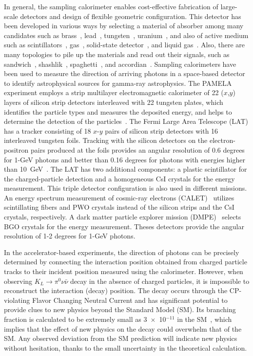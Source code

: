 \documentclass[12pt,times,draftclsnofoot,a4paper]{elsarticle}
\begin{document}
In general, the sampling calorimeter enables cost-effective fabrication of large-scale detectors and design of flexible geometric configuration. This detector has been developed in various ways by selecting a material of absorber among many candidates such as brass~\cite{CMS:mat}, lead~\cite{CDF:mat}, tungsten~\cite{DELPHI:mat}, uranium~\cite{UGAS:mat}, and also of active medium such as scintillators~\cite{CMS:mat,CDF:mat}, gas~\cite{UGAS:mat}, solid-state detector~\cite{DELPHI:mat}, and liquid gas~\cite{LiqAR:mat}. Also, there are many topologies to pile up the materials and read out their signals, such as sandwich~\cite{KOTO:MB}, shashlik~\cite{shashlik:con}, spaghetti~\cite{KLOE:con}, and accordian~\cite{LiqAR:mat}. Sampling calorimeters have been used to measure the direction of arriving photons in a space-based detector to identify astrophysical sources for gamma-ray astrophysics. The PAMELA experiment employs a strip multilayer electromagnetic calorimeter of 22 ($x$,$y$) layers of silicon strip detectors interleaved with 22 tungsten plates, which identifies the particle types and measures the deposited energy, and helps to determine the detection of the particles~\cite{PAMELA}. The Fermi Large Area Telescope (LAT) has a tracker consisting of 18 $x$-$y$ pairs of silicon strip detectors with 16 interleaved tungsten foils. Tracking with the silicon detectors on the electron-positron pairs produced at the foils provides an angular resolution of 0.6 degrees for 1-GeV photons and better than 0.16 degrees for photons with energies higher than 10~GeV~\cite{FERMI:LAT}. The LAT has two additional components: a plastic scintillator for the charged-particle detection and a homogeneous CsI crystals for the energy measurement. This triple detector configuration is also used in different missions. An energy spectrum measurement of cosmic-ray electrons (CALET)~\cite{CALET} utilizes scintillating fibers and PWO crystals instead of the silicon strips and the CsI crystals, respectively. A dark matter particle explorer mission (DMPE)~\cite{DMPE} selects BGO crystals for the energy measurement. Theses detectors provide the angular resolution of 1-2 degrees for 1-GeV photons.

In the accelerator-based experiments, the direction of photons can be precisely determined by connecting the interaction position obtained from charged particle tracks to their incident position measured using the calorimeter. However, when observing $K_{L} \rightarrow \pi^{0}\nu\bar{\nu}$ decay in the absence of charged particles, it is impossible to reconstruct the interaction (decay) position. The decay occurs through the CP-violating Flavor Changing Neutral Current and has significant potential to provide clues to new physics beyond the Standard Model (SM). Its branching fraction is calculated to be extremely small as 3~$\times$~10$^{-11}$ in the SM~\cite{KOTOtheory}, which implies that the effect of new physics on the decay could overwhelm that of the SM. Any observed deviation from the SM prediction will indicate new physics without hesitation, thanks to the small uncertainty in the theoretical calculation.
\end{document}
